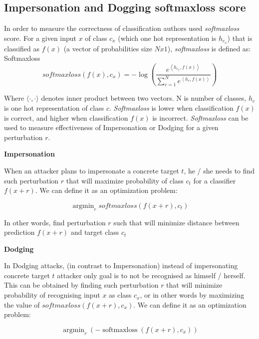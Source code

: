\subsection{Impersonation and Dogging softmaxloss score}

In order to measure the correctness of classification authors used \textit{softmaxloss} score. For a given input $x$ of class $c_x$ (which one hot representation is $h_{c_x}$) that is classified as $f(x)$ (a vector of probabilities size $Nx1$), \textit{softmaxloss} is defined as:
Softmaxloss
\begin{equation}
\textit {softmaxloss}\left(f(x), c_{x}\right)=-\log \left(\frac{e^{\left\langle h_{c_{x}}, f(x)\right\rangle}}{\sum_{c=1}^{N} e^{\left\langle h_{c}, f(x)\right\rangle}}\right)
\end{equation}

Where $\langle\cdot, \cdot\rangle$ denotes inner product between two vectors. N is number of classes, $h_c$ is one hot representation of class $c$. \textit{Softmaxloss} is lower when classification $f(x)$ is correct, and higher when classification $f(x)$ is incorrect. \textit{Softmaxloss} can be used to measure effectiveness of Impersonation or Dodging  for a given perturbation $r$. 

\textbf{Impersonation}

When an attacker plans to impersonate a concrete target $t$, he / she needs to find such perturbation $r$ that will maximize probability of class $c_t$ for a classifier $f(x+r)$. We can define it as an optimization problem:

\begin{equation}
\operatorname{argmin}_{r} \textit{softmaxloss}\left(f(x+r), c_{t}\right)
\end{equation}

In other words, find perturbation $r$ such that will minimize distance between prediction $f(x+r)$ and target class $c_t$
\newpage

\textbf{Dodging}


In Dodging attacks, (in contrast to Impersonation) instead of impersonating concrete target $t$ attacker only goal is to not be recognised as himself / herself. This can be obtained by finding such perturbation $r$ that will minimize probability of recognising input $x$ as class $c_x$, or in other words by maximizing the value of $\textit{softmaxloss}(f(x+r), c_x)$. We can define it as an optimization problem:

\begin{equation}
\operatorname{argmin}_{r}\left(-\operatorname{softmaxloss}\left(f(x+r), c_{x}\right)\right)
\end{equation}


